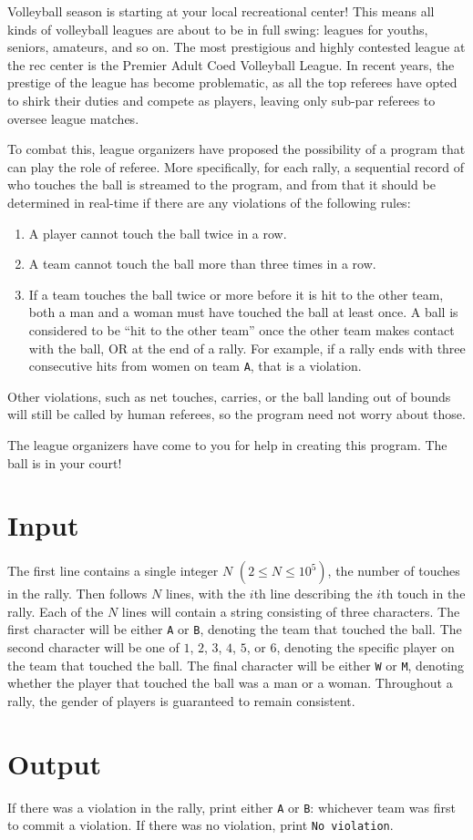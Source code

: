 
Volleyball season is starting at your local recreational center! This means all kinds of volleyball
leagues are about to be in full swing: leagues for youths, seniors, amateurs, and so on. The most
prestigious and highly contested league at the rec center is the Premier Adult Coed Volleyball
League. In recent years, the prestige of the league has become problematic, as all the top referees
have opted to shirk their duties and compete as players, leaving only sub-par referees to oversee
league matches.

To combat this, league organizers have proposed the possibility of a program that can play the role of
referee. More specifically, for each rally, a sequential record of who touches the ball is streamed to
the program, and from that it should be determined in real-time if there are any violations of the
following rules:

\begin{enumerate}
    \item A player cannot touch the ball twice in a row.
    \item A team cannot touch the ball more than three times in a row.
    \item If a team touches the ball twice or more before it is hit to the other team, both a man
    and a woman must have touched the ball at least once. A ball is considered to be ``hit to the other
    team'' once the other team makes contact with the ball, OR at the end of a rally. For example, if a
    rally ends with three consecutive hits from women on team \texttt{A}, that is a violation.
\end{enumerate}

Other violations, such as net touches, carries, or the ball landing out of bounds will still be called
by human referees, so the program need not worry about those.

The league organizers have come to you for help in creating this program. The ball is in your court!

\section*{Input}

The first line contains a single integer $N$ $(2 \leq N \leq 10^5)$, the number of touches in the rally. 
Then follows $N$ lines, with the $i$th line describing the $i$th touch in the rally. Each of the $N$ lines
will contain a string consisting of three characters. The first character will be either \texttt{A} or
\texttt{B}, denoting the team that touched the ball. The second character will be one of $1$,
$2$, $3$, $4$, $5$, or $6$, denoting the specific player on the team that
touched the ball. The final character will be either \texttt{W} or \texttt{M}, denoting whether the player
that touched the ball was a man or a woman. Throughout a rally, the gender of players is guaranteed to
remain consistent.

\section*{Output}

If there was a violation in the rally, print either \texttt{A} or \texttt{B}: whichever team was first to
commit a violation. If there was no violation, print \texttt{No violation}.

